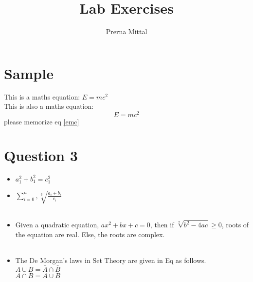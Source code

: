 \documentclass[a4paper,12pt]{article}
\begin{document}
\title{Lab Exercises}
\author{Prerna Mittal}
\maketitle
{}
\tableofcontents
\newpage

\section{Sample}
This is a maths equation:
$E=mc^2$\\
This is also a maths equation:
\begin{equation}
    \label{emc}
    E=mc^2
\end{equation}
please memorize eq \ref{emc}

\section{Question 3}
\begin{itemize}
    \item $a_1^2+b_1^2=c_1^2$
    \item $\sum_{i=0}^{n}, \sqrt[3]{\frac{a_i+b_i}{c_i}}$\\\\
    \item Given a quadratic equation, $ax^2+bx+c=0$, then if $\sqrt[2]{b^2-4ac}\geq0$, roots of
    the equation are real. Else, the roots are complex.\\\\
    \item The De Morgan’s laws in Set Theory are given in Eq as follows.\\
    ${A}\cup{B}=\bar{A}\cap\bar{B}$\\
    ${A}\cap{B}=\bar{A}\cup\bar{B}$\\    
\end{itemize}
\end{document}
